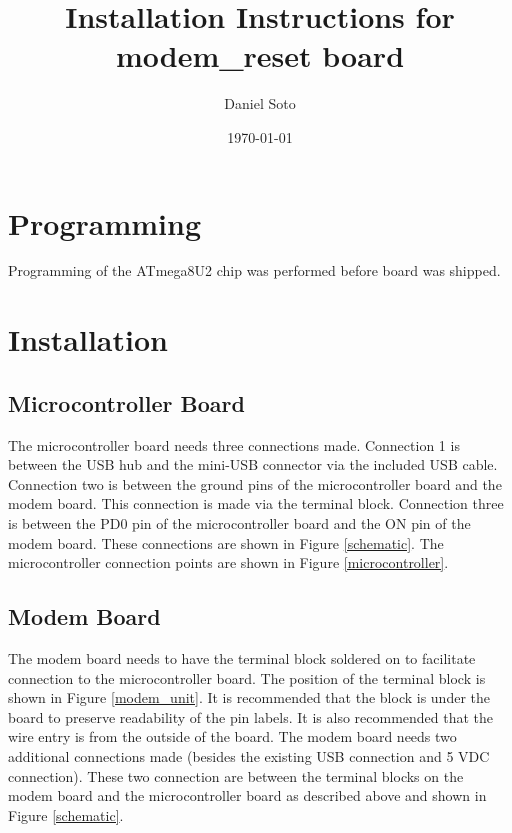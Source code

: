 \documentclass{article}
\title{Installation Instructions for modem\_reset board}
\author{Daniel Soto}
\date{\today}
\begin{document}
\maketitle

\section{Programming}
Programming of the ATmega8U2 chip was performed before board was shipped.


\section{Installation}

\subsection{Microcontroller Board}
The microcontroller board needs three connections made.
Connection 1 is between the USB hub and the mini-USB connector via the included
USB cable.
Connection two is between the ground pins of the microcontroller board and the
modem board.  This connection is made via the terminal block.
Connection three is between the PD0 pin of the microcontroller board and the 
ON pin of the modem board.
These connections are shown in Figure \ref{schematic}.
The microcontroller connection points are shown in Figure \ref{microcontroller}.

\subsection{Modem Board}
The modem board needs to have the terminal block soldered on to facilitate 
connection to the microcontroller board.
The position of the terminal block is shown in Figure \ref{modem_unit}.
It is recommended that the block is under the board to preserve readability
of the pin labels.
It is also recommended that the wire entry is from the outside of the board.
The modem board needs two additional connections made (besides the existing
USB connection and 5 VDC connection).
These two connection are between the terminal blocks on the modem board and 
the microcontroller board as described above and shown in Figure \ref{schematic}.
\end{document}

